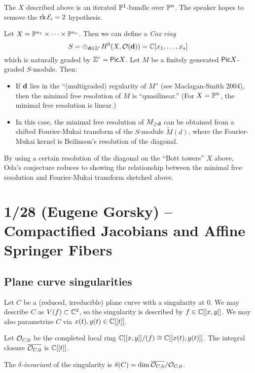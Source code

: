\documentclass{article}
\begin{document}
The $X$ described above is an iterated $\mathbb{P}^1$-bundle over $\mathbb{P}^n$.
The speaker hopes to remove the $\operatorname{rk} \mathcal{E}_i = 2$ hypothesis.

\begin{rmk}
	Let $X = \mathbb{P}^{n_1} \times \dots \times \mathbb{P}^{n_r}$.
	Then we can define a \emph{Cox ring}
	\[
		S = \oplus_{\mathbf{d} \in \mathbb{Z}^r} H^0(X, \mathcal{O}(\mathbf{d})) = \mathbb{C}[x_1, \dots, x_s]
	\]
	which is naturally graded by $\mathbb{Z}^r = \mathsf{Pic} X$.
	Let $M$ be a finitely generated $\mathsf{Pic} X$-graded $S$-module.
	Then:
	\begin{itemize}
		\item If $\mathbf{d}$ lies in the ``(multigraded) regularity of $M$'' (see Maclagan-Smith 2004), then the minimal free resolution of $M$ is ``quasilinear.''
			(For $X = \mathbb{P}^n$, the minimal free resolution is linear.)
		\item In this case, the minimal free resolution of $M_{\geq \mathbf{d}}$ can be obtained from a shifted Fourier-Mukai transform of the $S$-module $\tilde{M}(d)$, where the Fourier-Mukai kernel is Beilinson's resolution of the diagonal.
	\end{itemize}
\end{rmk}

By using a certain resolution of the diagonal on the ``Bott towers'' $X$ above, Oda's conjecture reduces to showing the relationship between the minimal free resolution and Fourier-Mukai transform sketched above.

\section{1/28 (Eugene Gorsky) -- Compactified Jacobians and Affine Springer Fibers}

\subsection{Plane curve singularities}

Let $C$ be a (reduced, irreducible) plane curve with a singularity at $0$.
We may describe $C$ as $V(f) \subset \mathbb{C}^2$, so the singularity is described by $f \in \mathbb{C}[[x, y]]$.
We may also parametrize $C$ via $x(t), y(t) \in \mathbb{C}[[t]]$.

Let $\mathcal{O}_{C,0}$ be the completed local ring $\mathbb{C}[[x,y]] / (f) \cong \mathbb{C}[[x(t), y(t)]]$.
The integral closure $\overline{\mathcal{O}_{C,0}}$ is $\mathbb{C}[[t]]$.

\begin{dfn}
	The \emph{$\delta$-invariant} of the singularity is $\delta(C) = \dim \overline{\mathcal{O}_{C,0}} / \mathcal{O}_{C,0}$.
\end{dfn}
\end{document}
